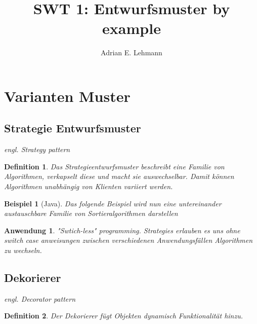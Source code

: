 \documentclass[a4paper]{article}
\title{SWT 1: Entwurfsmuster by example}
\author{Adrian E. Lehmann}
\theoremstyle{break}
\newtheorem{defi}{Definition}[section]
\newtheorem{ex}{Beispiel}[section]
\newtheorem{why}{Anwendung}[section]
\begin{document}
\maketitle
\tableofcontents
\newpage

\section{Varianten Muster}

\subsection{Strategie Entwurfsmuster}

\textit{engl. Strategy pattern}

\begin{defi}
	Das Strategieentwurfsmuster beschreibt eine Familie von Algorithmen, verkapselt diese und macht sie auswechselbar. Damit können Algorithmen unabhängig von Klienten variiert werden.
\end{defi}

\begin{ex}[Java]
	Das folgende Beispiel wird nun eine untereinander austauschbare Familie von Sortieralgorithmen darstellen


	
	
	
	
		
\end{ex}

\begin{why}
	"Swtich-less" programming. Strategies erlauben es uns ohne switch case anweisungen zwischen verschiedenen Anwendungsfällen Algorithmen zu wechseln.
\end{why}

\newpage
\subsection{Dekorierer}

\textit{engl. Decorator pattern}

\begin{defi}
	Der Dekorierer fügt Objekten dynamisch Funktionalität hinzu.
\end{defi}
\end{document}
